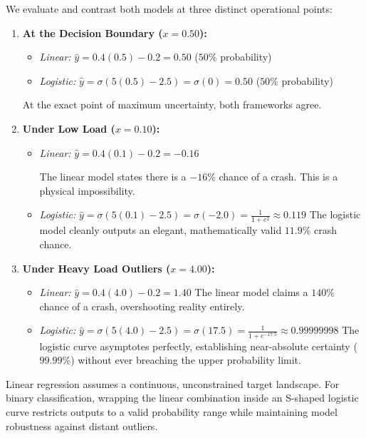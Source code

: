 \documentclass{article}
\begin{document}
We evaluate and contrast both models at three distinct operational points:
\begin{enumerate}
    \item \textbf{At the Decision Boundary ($x = 0.50$):}
    \begin{itemize}
        \item \textit{Linear:} $\hat{y} = 0.4(0.5) - 0.2 = \mathbf{0.50}$ ($50\%$ probability)
        \item \textit{Logistic:} $\hat{y} = \sigma(5(0.5) - 2.5) = \sigma(0) = \mathbf{0.50}$ ($50\%$ probability)
    \end{itemize}
    At the exact point of maximum uncertainty, both frameworks agree.

    \item \textbf{Under Low Load ($x = 0.10$):}
    \begin{itemize}
        \item \textit{Linear:} $\hat{y} = 0.4(0.1) - 0.2 = \mathbf{-0.16}$
        \begin{tcolorbox}[colback=red!5!white, colframe=red!60!black, title=Mathematical Breakdown]
        The linear model states there is a \textbf{$-16\%$} chance of a crash. This is a physical impossibility.
        \end{tcolorbox}
        \item \textit{Logistic:} $\hat{y} = \sigma(5(0.1) - 2.5) = \sigma(-2.0) = \frac{1}{1 + e^2} \approx \mathbf{0.119}$
        The logistic model cleanly outputs an elegant, mathematically valid $11.9\%$ crash chance.
    \end{itemize}

    \item \textbf{Under Heavy Load Outliers ($x = 4.00$):}
    \begin{itemize}
        \item \textit{Linear:} $\hat{y} = 0.4(4.0) - 0.2 = \mathbf{1.40}$ 
        The linear model claims a \textbf{$140\%$} chance of a crash, overshooting reality entirely.
        \item \textit{Logistic:} $\hat{y} = \sigma(5(4.0) - 2.5) = \sigma(17.5) = \frac{1}{1 + e^{-17.5}} \approx \mathbf{0.99999998}$
        The logistic curve asymptotes perfectly, establishing near-absolute certainty ($99.99\%$) without ever breaching the upper probability limit.
    \end{itemize}
\end{enumerate}

\begin{tcolorbox}[colback=blue!5!white, colframe=blue!60!black, title=Core Takeaway]
Linear regression assumes a continuous, unconstrained target landscape. For binary classification, wrapping the linear combination inside an S-shaped logistic curve restricts outputs to a valid probability range while maintaining model robustness against distant outliers.
\end{tcolorbox}
\end{document}
